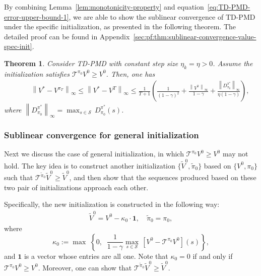 \documentclass[10pt]{article}
\newcommand{\calS}{\mathcal{S}}
\newcommand{\calT}{\mathcal{T}}
\newcommand{\ls}{\left}
\newcommand{\rs}{\right}
\theoremstyle{plain}
\newtheorem{theorem}{Theorem}[section]
\theoremstyle{definition}
\begin{document}
By combining Lemma~\ref{lem:monotonicity-property} and equation~\eqref{eq:TD-PMD-error-upper-bound-1}, we are able to show the sublinear convergence of TD-PMD under the  specific initialization, as presented in the following theorem.  The detailed proof  can be found in Appendix~\ref{sec:pf:thm:sublinear-convergence-value-spec-init}.
\begin{theorem}
 Consider TD-PMD with constant step size $\eta_k=\eta>0$. Assume the initialization satisfies $\calT^{\pi_0} V^0 \geq V^0$. Then, one has
    \begin{align*}
        &\phantom{\leq\,\,\,}\ls\| V^* - V^{\pi_T} \rs\|_\infty \leq \ls\| V^* - V^T \rs\|_\infty \leq \frac{1}{T+1} \ls( \frac{1}{(1-\gamma)^2} \!+\! \frac{\ls\| V^0 \rs\|_\infty}{1-\gamma} \!+\! \frac{\ls\| D^{\pi^*}_{\pi_0} \rs\|_\infty}{\eta(1-\gamma)} \rs),
    \end{align*}
    where $\ls\| D^{\pi^*}_{\pi_0} \rs\|_\infty = \max_{s\in\calS} \, D^{\pi^*}_{\pi_0}(s)$.
    \label{thm:sublinear-convergence-value-spec-init}
\end{theorem}

\subsubsection{Sublinear convergence for general initialization}
\label{sec:Sublinear Convergence for General Initialization}



Next we discuss the case of general initialization, in which $\calT^{\pi_0} V^0 \geq V^0$ may not hold. The key idea is to construct another initialization $\{ \tilde{V}^0, \tilde{\pi}_0 \}$ based on $\{ V^0, \pi_0 \}$ such that $\calT^{\tilde{\pi}_0} \tilde{V}^0 \geq \tilde{V}^0$, and then show that the sequences produced based on these two pair of initializations approach each other. 

Specifically, the new initialization is constructed in the following way:
\begin{align}
    \tilde{V}^0 = V^0 - \kappa_0 \cdot \mathbf{1}, \quad \tilde{\pi}_0 = \pi_0,
    \label{eq:init}
\end{align}
where 
\[\kappa_0 :=  \max \; \ls\{0, \;\; \frac{1}{1-\gamma} \max_{s\in\calS} \, [V^0 - \calT^{\pi_0}V^0](s) \rs\} , \]
and $\mathbf{1}$ is a vector whose entries are all one. Note that $\kappa_0=0$ if and only if $\calT^{\pi_0} V^0 \geq V^0$. %
Moreover, one can show that $\calT^{\tilde{\pi}_0} \tilde{V}^0 \geq \tilde{V}^0$.
\end{document}
